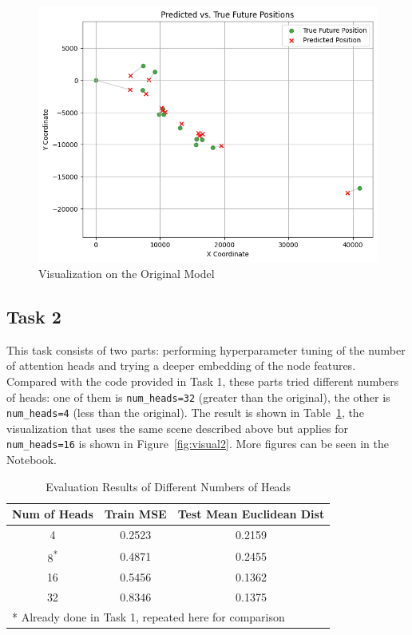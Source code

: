 \documentclass[conference]{IEEEtran}
\begin{document}
\begin{figure}[htbp]
    \centering
    \includegraphics[width=0.8\linewidth]{figvisual1.png}
    \caption{Visualization on the Original Model}
    \label{fig:visual1}
\end{figure}

\subsection*{Task 2}

This task consists of two parts: performing hyperparameter tuning of the number
of attention heads and trying a deeper embedding of the node features.
Compared with the code provided in Task 1, these parts tried different numbers
of heads: one of them is \texttt{num\_heads=32} (greater than the original),
the other is \texttt{num\_heads=4} (less than the original). The result is
shown in Table~\ref{tab:nh}, the visualization that uses the same scene
described above but applies for \texttt{num\_heads=16} is shown in
Figure~\ref{fig:visual2}. More figures can be seen in the Notebook.

\begin{table}[htbp]
    \caption{Evaluation Results of Different Numbers of Heads}
    \begin{center}
    \begin{tabular}{|c|c|c|}
    \hline
    \textbf{Num of Heads} & \textbf{Train MSE} & \textbf{Test Mean Euclidean Dist} \\
    \hline
    4 & 0.2523 & 0.2159 \\
    \hline
    8\textsuperscript{*} & 0.4871 & 0.2455 \\
    \hline
    16 & 0.5456 & 0.1362 \\
    \hline
    32 & 0.8346 & 0.1375 \\
    \hline

    \multicolumn{3}{l}{* Already done in Task 1, repeated here
        for comparison}
    \end{tabular}
    \label{tab:nh}
    \end{center}
\end{table}
\end{document}
